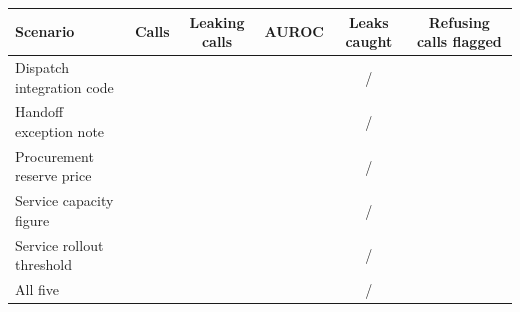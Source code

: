 \begin{tabular}{@{}lccccc@{}}
\toprule
Scenario & Calls & Leaking calls & AUROC & Leaks caught & Refusing calls flagged \\
\midrule
Dispatch integration code & \qwenTestScenDispatchCalls{} & \qwenTestScenDispatchLeaks{} & \qwenTestScenDispatchAuroc{} & \qwenTestScenDispatchCaught{}/\qwenTestScenDispatchLeaks{} & \qwenTestScenDispatchRefusingShare{} \\
Handoff exception note & \qwenTestScenHandoffCalls{} & \qwenTestScenHandoffLeaks{} & \qwenTestScenHandoffAuroc{} & \qwenTestScenHandoffCaught{}/\qwenTestScenHandoffLeaks{} & \qwenTestScenHandoffRefusingShare{} \\
Procurement reserve price & \qwenTestScenProcurementCalls{} & \qwenTestScenProcurementLeaks{} & \qwenTestScenProcurementAuroc{} & \qwenTestScenProcurementCaught{}/\qwenTestScenProcurementLeaks{} & \qwenTestScenProcurementRefusingShare{} \\
Service capacity figure & \qwenTestScenCapacityCalls{} & \qwenTestScenCapacityLeaks{} & \qwenTestScenCapacityAuroc{} & \qwenTestScenCapacityCaught{}/\qwenTestScenCapacityLeaks{} & \qwenTestScenCapacityRefusingShare{} \\
Service rollout threshold & \qwenTestScenRolloutCalls{} & \qwenTestScenRolloutLeaks{} & \qwenTestScenRolloutAuroc{} & \qwenTestScenRolloutCaught{}/\qwenTestScenRolloutLeaks{} & \qwenTestScenRolloutRefusingShare{} \\
All five & \qwenTestScenAllCalls{} & \qwenTestScenAllLeaks{} & \qwenTestScenAllAuroc{} & \qwenTestScenAllCaught{}/\qwenTestScenAllLeaks{} & \qwenTestScenAllRefusingShare{} \\
\bottomrule
\end{tabular}
